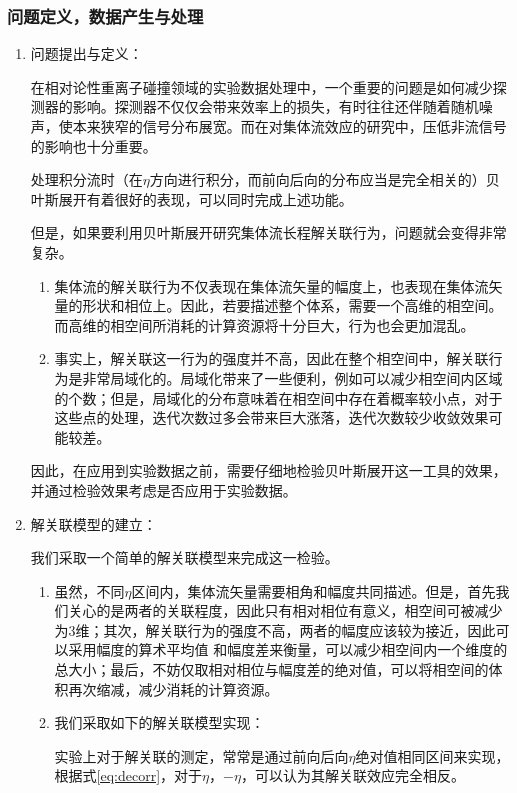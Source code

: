 \documentclass[aps,pre,12pt,preprint,onecolumn,showpacs,showkeys]{revtex4-1}
\begin{document}
\subsubsection{问题定义，数据产生与处理}
\begin{enumerate}
    \item 问题提出与定义：\par
    在相对论性重离子碰撞领域的实验数据处理中，一个重要的问题是如何减少探测器的影响。探测器不仅仅会带来效率上的损失，有时往往还伴随着随机噪声，使本来狭窄的信号分布展宽。而在对集体流效应的研究中，压低非流信号的影响也十分重要。
    \par
    处理积分流时（在$\eta$方向进行积分，而前向后向的分布应当是完全相关的）贝叶斯展开有着很好的表现，可以同时完成上述功能。\par
    但是，如果要利用贝叶斯展开研究集体流长程解关联行为，问题就会变得非常复杂。
    \begin{enumerate}
        \item 集体流的解关联行为不仅表现在集体流矢量的幅度上，也表现在集体流矢量的形状和相位上。因此，若要描述整个体系，需要一个高维的相空间。而高维的相空间所消耗的计算资源将十分巨大，行为也会更加混乱。
        \item 事实上，解关联这一行为的强度并不高，因此在整个相空间中，解关联行为是非常局域化的。局域化带来了一些便利，例如可以减少相空间内区域的个数；但是，局域化的分布意味着在相空间中存在着概率较小点，对于这些点的处理，迭代次数过多会带来巨大涨落，迭代次数较少收敛效果可能较差。
    \end{enumerate}
    因此，在应用到实验数据之前，需要仔细地检验贝叶斯展开这一工具的效果，并通过检验效果考虑是否应用于实验数据。
    \item 解关联模型的建立：\par
    我们采取一个简单的解关联模型来完成这一检验。\par
    \begin{enumerate}
        \item 虽然，不同$\eta$区间内，集体流矢量需要相角和幅度共同描述。但是，首先我们关心的是两者的关联程度，因此只有相对相位有意义，相空间可被减少为3维；其次，解关联行为的强度不高，两者的幅度应该较为接近，因此可以采用幅度的算术平均值
        和幅度差来衡量，可以减少相空间内一个维度的总大小；最后，不妨仅取相对相位与幅度差的绝对值，可以将相空间的体积再次缩减，减少消耗的计算资源。
        \item 我们采取如下的解关联模型实现：\par
        实验上对于解关联的测定，常常是通过前向后向$\eta$绝对值相同区间来实现，根据式\ref{eq:decorr}，对于$\eta$，$-\eta$，可以认为其解关联效应完全相反。

\end{enumerate}
\end{enumerate}
\end{document}
